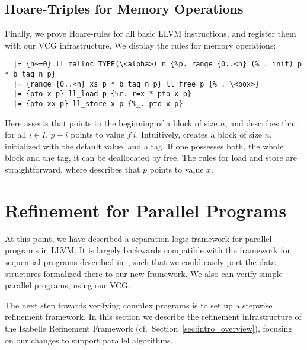 \documentclass[runningheads]{llncs}
\begin{document}
  \subsection{Hoare-Triples for Memory Operations}
  Finally, we prove Hoare-rules for all basic LLVM instructions, and register them with our VCG infrastructure.
  We display the rules for memory operations:
  \begin{lstlisting}
  |= {n~=0} ll_malloc TYPE(\<alpha>) n {%p. range {0..<n} (%_. init) p * b_tag n p}
  |= {range {0..<n} xs p * b_tag n p} ll_free p {%_. \<box>}
  |= {pto x p} ll_load p {%r. r=x * pto x p}
  |= {pto xx p} ll_store x p {%_. pto x p}
  \end{lstlisting}
  Here  asserts that  points to the beginning of a block of size \is$n$, and
   describes that for all $i\in I$, $p+i$ points to value $f~i$.
  Intuitively,  creates a block of size $n$, initialized with the default  value,
  and a tag. If one possesses both, the whole block and the tag, it can be deallocated by free.
  The rules for load and store are straightforward, where  describes that $p$ points to value $x$.

  \section{Refinement for Parallel Programs}\label{sec:refine_parallel}
  At this point, we have described a separation logic framework for parallel programs in LLVM.
  It is largely backwards compatible with the framework for sequential programs described in~\cite{La19-llvm},
  such that we could easily port the data structures formalized there to our new framework.
  We also can verify simple parallel programs, using our VCG.

  The next step towards verifying complex programs is to set up a stepwise refinement framework.
  In this section we describe the refinement infrastructure of the
  Isabelle Refinement Framework (cf.~Section~\ref{sec:intro_overview}), focusing on our changes to support parallel algorithms.
\end{document}
